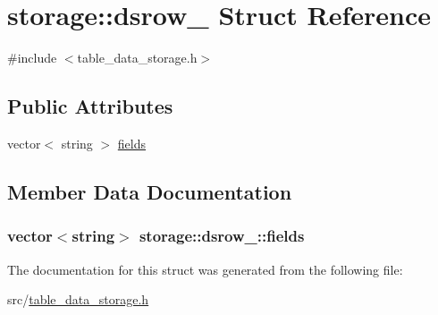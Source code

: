 \hypertarget{structstorage_1_1dsrow__}{
\section{storage::dsrow\_\- Struct Reference}
\label{de/d6b/structstorage_1_1dsrow__}
}


{\ttfamily \#include $<$table\_\-data\_\-storage.h$>$}

\subsection*{Public Attributes}
\begin{DoxyCompactItemize}
\item 
vector$<$ string $>$ \hyperlink{structstorage_1_1dsrow___afd086e21b6eb76e655f91e8887ce6aff}{fields}
\end{DoxyCompactItemize}


\subsection{Member Data Documentation}
\hypertarget{structstorage_1_1dsrow___afd086e21b6eb76e655f91e8887ce6aff}{
\subsubsection[{fields}]{\setlength{\rightskip}{0pt plus 5cm}vector$<$string$>$ {\bf storage::dsrow\_\-::fields}}}
\label{de/d6b/structstorage_1_1dsrow___afd086e21b6eb76e655f91e8887ce6aff}


The documentation for this struct was generated from the following file:\begin{DoxyCompactItemize}
\item 
src/\hyperlink{table__data__storage_8h}{table\_\-data\_\-storage.h}\end{DoxyCompactItemize}
